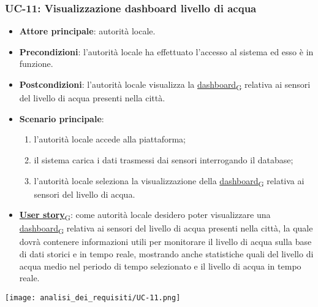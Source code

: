 \newpage

\subsubsection{UC-11: Visualizzazione dashboard livello di acqua}
\begin{itemize}
	\item \textbf{Attore principale}: autorità locale.
	\item \textbf{Precondizioni}: l'autorità locale ha effettuato l'accesso al sistema ed esso è in funzione.
	\item \textbf{Postcondizioni}: l'autorità locale visualizza la \href{https://7last.github.io/docs/rtb/documentazione-interna/glossario\#dashboard}{dashboard\textsubscript{G}} relativa
	      ai sensori del livello di acqua presenti nella città.
	\item \textbf{Scenario principale}:
	      \begin{enumerate}
		      \item l'autorità locale accede alla piattaforma;
		      \item il sistema carica i dati trasmessi dai sensori interrogando il database;
		      \item l'autorità locale seleziona la visualizzazione della \href{https://7last.github.io/docs/rtb/documentazione-interna/glossario\#dashboard}{dashboard\textsubscript{G}} relativa ai sensori del livello di acqua.
	      \end{enumerate}
	\item \href{https://7last.github.io/docs/rtb/documentazione-interna/glossario\#user-story}{\textbf{User story}\textsubscript{G}}:
	      come autorità locale desidero poter visualizzare una \href{https://7last.github.io/docs/rtb/documentazione-interna/glossario\#dashboard}{dashboard\textsubscript{G}} relativa ai sensori del livello di acqua presenti nella città, la quale
	      dovrà contenere informazioni utili per monitorare il livello di acqua sulla base di dati storici e in tempo reale, mostrando
	      anche statistiche quali del livello di acqua medio nel periodo di tempo selezionato e il livello di acqua in tempo reale.
\end{itemize}
\begin{center}
	\texttt{[image: analisi\_dei\_requisiti/UC-11.png]}
\end{center}

